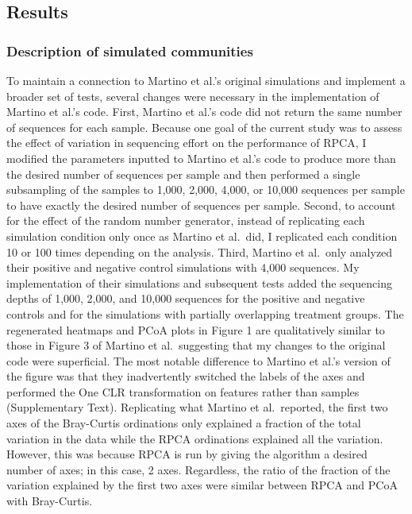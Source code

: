 \documentclass[
  11pt,
]{article}
\begin{document}
\subsection{Results}\label{results}

\subsubsection{Description of simulated
communities}\label{description-of-simulated-communities}

To maintain a connection to Martino et al.'s original simulations and
implement a broader set of tests, several changes were necessary in the
implementation of Martino et al.'s code. First, Martino et al.'s code
did not return the same number of sequences for each sample. Because one
goal of the current study was to assess the effect of variation in
sequencing effort on the performance of RPCA, I modified the parameters
inputted to Martino et al.'s code to produce more than the desired
number of sequences per sample and then performed a single subsampling
of the samples to 1,000, 2,000, 4,000, or 10,000 sequences per sample to
have exactly the desired number of sequences per sample. Second, to
account for the effect of the random number generator, instead of
replicating each simulation condition only once as Martino et al.~did, I
replicated each condition 10 or 100 times depending on the analysis.
Third, Martino et al.~only analyzed their positive and negative control
simulations with 4,000 sequences. My implementation of their simulations
and subsequent tests added the sequencing depths of 1,000, 2,000, and
10,000 sequences for the positive and negative controls and for the
simulations with partially overlapping treatment groups. The regenerated
heatmaps and PCoA plots in Figure 1 are qualitatively similar to those
in Figure 3 of Martino et al.~suggesting that my changes to the original
code were superficial. The most notable difference to Martino et al.'s
version of the figure was that they inadvertently switched the labels of
the axes and performed the One CLR transformation on features rather
than samples (Supplementary Text). Replicating what Martino et
al.~reported, the first two axes of the Bray-Curtis ordinations only
explained a fraction of the total variation in the data while the RPCA
ordinations explained all the variation. However, this was because RPCA
is run by giving the algorithm a desired number of axes; in this case, 2
axes. Regardless, the ratio of the fraction of the variation explained
by the first two axes were similar between RPCA and PCoA with
Bray-Curtis.
\end{document}
